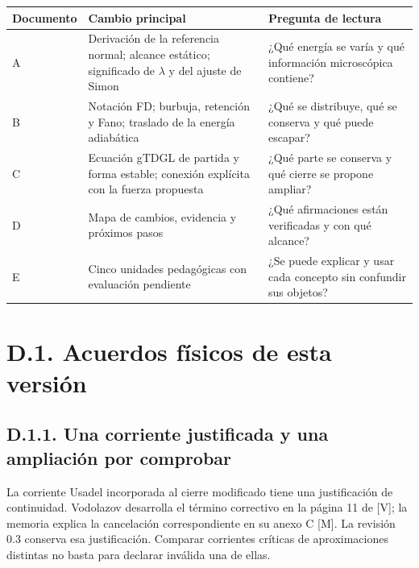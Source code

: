 \documentclass[
  spanish,
  10pt,
  a4paper,
]{article}
\newcounter{none} %
\begin{document}
{\def\LTcaptype{none} %
\begin{longtable}[]{@{}
  >{\raggedright\arraybackslash}p{}
  >{\raggedright\arraybackslash}p{}
  >{\raggedright\arraybackslash}p{}@{}}
\toprule\noalign{}
\begin{minipage}[b]{\linewidth}\raggedright
Documento
\end{minipage} & \begin{minipage}[b]{\linewidth}\raggedright
Cambio principal
\end{minipage} & \begin{minipage}[b]{\linewidth}\raggedright
Pregunta de lectura
\end{minipage} \\
\midrule\noalign{}
\endhead
\bottomrule\noalign{}
\endlastfoot
A & Derivación de la referencia normal; alcance estático; significado de
\(\lambda\) y del ajuste de Simon & ¿Qué energía se varía y qué
información microscópica contiene? \\
B & Notación FD; burbuja, retención y Fano; traslado de la energía
adiabática & ¿Qué se distribuye, qué se conserva y qué puede escapar? \\
C & Ecuación gTDGL de partida y forma estable; conexión explícita con la
fuerza propuesta & ¿Qué parte se conserva y qué cierre se propone
ampliar? \\
D & Mapa de cambios, evidencia y próximos pasos & ¿Qué afirmaciones
están verificadas y con qué alcance? \\
E & Cinco unidades pedagógicas con evaluación pendiente & ¿Se puede
explicar y usar cada concepto sin confundir sus objetos? \\
\end{longtable}
}

\section{D.1. Acuerdos físicos de esta
versión}\label{d.1.-acuerdos-fuxedsicos-de-esta-versiuxf3n}

\subsection{D.1.1. Una corriente justificada y una ampliación por
comprobar}\label{d.1.1.-una-corriente-justificada-y-una-ampliaciuxf3n-por-comprobar}

La corriente Usadel incorporada al cierre modificado tiene una
justificación de continuidad. Vodolazov desarrolla el término correctivo
en la página 11 de {[}V{]}; la memoria explica la cancelación
correspondiente en su anexo C {[}M{]}. La revisión 0.3 conserva esa
justificación. Comparar corrientes críticas de aproximaciones distintas
no basta para declarar inválida una de ellas.
\end{document}
